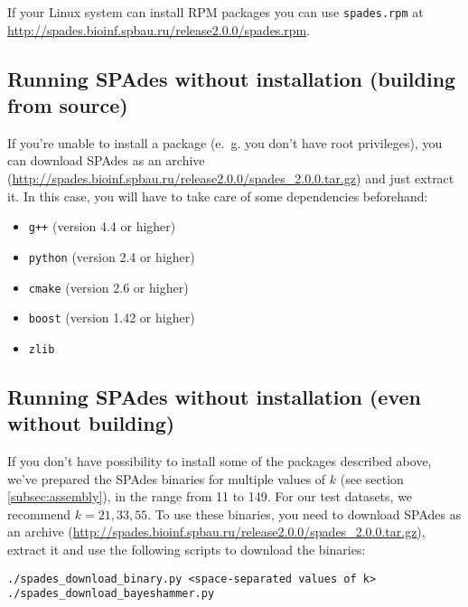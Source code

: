\documentclass{article}
\def\spades{SPAdes}
\begin{document}
If your Linux system can install RPM packages you can use {\tt spades.rpm}
at \url{http://spades.bioinf.spbau.ru/release2.0.0/spades.rpm}.

\subsection{Running {\spades} without installation (building from source)}\label{subsec:archive}

If you're unable to install a package (e.~g. you don't have root privileges),
you can download {\spades} as an archive (\url{http://spades.bioinf.spbau.ru/release2.0.0/spades_2.0.0.tar.gz}) and just extract it.
In this case, you will have to take care of some dependencies beforehand:
\begin{itemize}
\item {\tt g++} (version 4.4 or higher)
\item {\tt python} (version 2.4 or higher)
\item {\tt cmake} (version 2.6 or higher)
\item {\tt boost} (version 1.42 or higher)
\item {\tt zlib}
\end{itemize}

\subsection{Running {\spades} without installation (even without building)}\label{subsec:binaries}

If you don't have possibility to install some of the packages described above,
we've prepared the {\spades} binaries for multiple values of $k$ (see section \ref{subsec:assembly}),
in the range from 11 to 149. For our test datasets, we recommend $k = 21, 33, 55$.
To use these binaries, you need to download {\spades} as an archive (\url{http://spades.bioinf.spbau.ru/release2.0.0/spades_2.0.0.tar.gz}),
extract it and use the following scripts to download the binaries:
\begin{lstlisting}
./spades_download_binary.py <space-separated values of k>
./spades_download_bayeshammer.py
\end{lstlisting}
\end{document}
